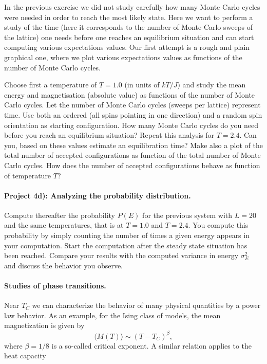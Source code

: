 \documentclass[%
oneside,                 %
final,                   %
10pt]{article}
\begin{document}
In the previous exercise  we did not study carefully how many Monte Carlo cycles were needed in order to reach the most likely state. Here
we want to perform a study of the time (here it corresponds to the number 
of Monte Carlo sweeps of the lattice) one needs before one reaches an equilibrium situation 
and can start computing various expectations values. Our 
first attempt is a rough and plain graphical
one, where we plot various expectations values as functions of the number of Monte Carlo cycles.

Choose first a temperature of $T=1.0$ (in units of $kT/J$) and study the 
mean energy and magnetisation (absolute value) as functions of the number of Monte Carlo cycles. Let the number of Monte Carlo cycles (sweeps per lattice)
represent time.
Use both an ordered (all spins pointing in one direction) and a random
spin orientation as starting configuration. 
How many Monte Carlo cycles do you need before you reach an equilibrium situation?
Repeat this analysis for $T=2.4$. 
Can you, based on these values estimate an equilibration time?
Make also a plot of the total number of accepted configurations 
as function of the total number of Monte Carlo cycles. How does the number of
accepted configurations behave as function of temperature $T$?

\paragraph{Project 4d): Analyzing the probability distribution.}
Compute thereafter the probability
$P(E)$ for the previous system with $L=20$ and the same temperatures, that is at $T=1.0$ and $T=2.4$.
You compute this probability by simply counting the number of times a 
given energy appears in your computation. Start the computation after 
the steady state situation has been reached.
Compare your results with the computed variance in energy 
$\sigma^2_E$ and discuss the behavior you observe. 

\paragraph{Studies of phase transitions.}
Near $T_C$ we can characterize the behavior of many physical quantities
by a power law behavior.
As an example, for the Ising class of models, 
the mean magnetization is given by
\[
  \langle M(T) \rangle \sim \left(T-T_C\right)^{\beta},
\]
where $\beta=1/8$ is a so-called critical exponent. A similar relation
applies to the heat capacity
\end{document}
